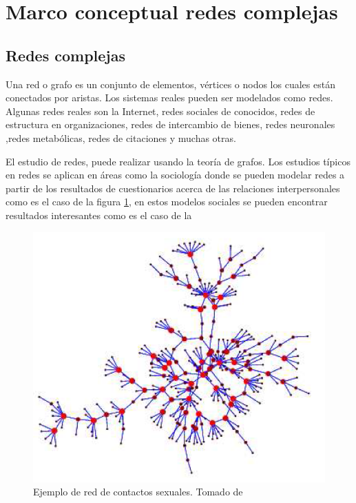 \section{Marco conceptual redes complejas}
\subsection{Redes complejas}

Una red o grafo\cite{Newman2003}
es un conjunto de elementos, vértices o nodos los cuales están conectados por aristas. Los sistemas reales pueden ser modelados como redes. Algunas redes reales son la Internet, redes sociales de conocidos, redes de estructura en organizaciones, redes de intercambio de bienes, redes neuronales ,redes metabólicas, redes de citaciones y muchas otras.

El estudio de redes, puede realizar usando la teoría de grafos. Los estudios típicos en redes se aplican en áreas como la sociología donde se pueden modelar redes a partir de los resultados de cuestionarios acerca de las relaciones interpersonales como es el caso de la figura \ref{fig:contactosSexuales}, en estos modelos sociales se pueden encontrar resultados interesantes como es el caso de la

\begin{figure}[H]
    \centering
    \includegraphics[scale=0.4]{Capitulo2EstadoDelArte/imagenes/contactos.png}
    \caption{Ejemplo de red de contactos sexuales. Tomado de \cite{Newman2003}}
    \label{fig:contactosSexuales}
\end{figure}

